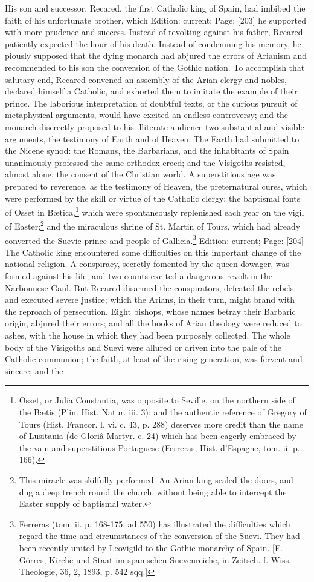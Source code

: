 His son and successor, Recared, the first Catholic king of Spain, had imbibed the faith of his unfortunate brother, which Edition: current; Page: [203] he supported with more prudence and success. Instead of revolting against his father, Recared patiently expected the hour of his death. Instead of condemning his memory, he piously supposed that the dying monarch had abjured the errors of Arianism and recommended to his son the conversion of the Gothic nation. To accomplish that salutary end, Recared convened an assembly of the Arian clergy and nobles, declared himself a Catholic, and exhorted them to imitate the example of their prince. The laborious interpretation of doubtful texts, or the curious pursuit of metaphysical arguments, would have excited an endless controversy; and the monarch discreetly proposed to his illiterate audience two substantial and visible arguments, the testimony of Earth and of Heaven. The Earth had submitted to the Nicene synod: the Romans, the Barbarians, and the inhabitants of Spain unanimously professed the same orthodox creed; and the Visigoths resisted, almost alone, the consent of the Christian world. A superstitious age was prepared to reverence, as the testimony of Heaven, the preternatural cures, which were performed by the skill or virtue of the Catholic clergy; the baptismal fonts of Osset in Bætica,\footnote{Osset, or Julia Constantia, was opposite to Seville, on the northern side of the Bætis (Plin. Hist. Natur. iii. 3); and the authentic reference of Gregory of Tours (Hist. Francor. l. vi. c. 43, p. 288) deserves more credit than the name of Lusitania (de Gloriâ Martyr. c. 24) which has been eagerly embraced by the vain and superstitious Portuguese (Ferreras, Hist. d\texthebrew{}’Espagne, tom. ii. p. 166).} which were spontaneously replenished each year on the vigil of Easter;\footnote{This miracle was skilfully performed. An Arian king sealed the doors, and dug a deep trench round the church, without being able to intercept the Easter supply of baptismal water.} and the miraculous shrine of St. Martin of Tours, which had already converted the Suevic prince and people of Gallicia.\footnote{Ferreras (tom. ii. p. 168-175, ad 550) has illustrated the difficulties which regard the time and circumstances of the conversion of the Suevi. They had been recently united by Leovigild to the Gothic monarchy of Spain. [F. Görres, Kirche und Staat im spanischen Suevenreiche, in Zeitsch. f. Wiss. Theologie, 36, 2, 1893, p. 542 sqq.]} Edition: current; Page: [204] The Catholic king encountered some difficulties on this important change of the national religion. A conspiracy, secretly fomented by the queen-dowager, was formed against his life; and two counts excited a dangerous revolt in the Narbonnese Gaul. But Recared disarmed the conspirators, defeated the rebels, and executed severe justice; which the Arians, in their turn, might brand with the reproach of persecution. Eight bishops, whose names betray their Barbaric origin, abjured their errors; and all the books of Arian theology were reduced to ashes, with the house in which they had been purposely collected. The whole body of the Visigoths and Suevi were allured or driven into the pale of the Catholic communion; the faith, at least of the rising generation, was fervent and sincere; and the 